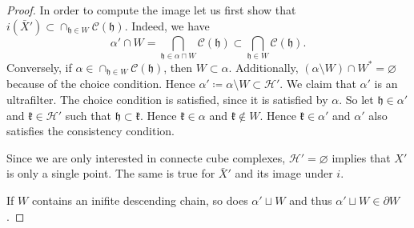 \begin{proof}
  In order to compute the image let us first show that \(i(\bar X') \subset \cap_{\mathfrak{h} \in W} \mathcal{C}(\mathfrak{h})\). Indeed, we have
  \[
    \alpha' \cap W = \bigcap_{\mathfrak{h} \in \alpha \sqcap W}\mathcal{C}(\mathfrak{h}) \subset \bigcap_{\mathfrak{h} \in W} \mathcal{C}(\mathfrak{h}).
  \]
  Conversely, if \(\alpha \in \cap_{\mathfrak{h} \in W}\mathcal{C}(\mathfrak{h})\), then \(W \subset \alpha\). Additionally, \((\alpha \setminus W) \cap W^\ast = \varnothing\) because of the choice condition. Hence \(\alpha' \coloneqq \alpha \setminus W \subset \mathcal{H}'\). We claim that \(\alpha'\) is an ultrafilter. The choice condition is satisfied, since it is satisfied by \(\alpha\). So let \(\mathfrak{h} \in \alpha'\) and \(\mathfrak{k} \in \mathcal{H}'\) such that \(\mathfrak{h} \subset \mathfrak{k}\). Hence \(\mathfrak{k} \in \alpha\) and \(\mathfrak{k} \notin W\). Hence \(\mathfrak{k} \in \alpha'\) and \(\alpha'\) also satisfies the consistency condition.

  Since we are only interested in connecte cube complexes, \(\mathcal{H}' = \varnothing\) implies that \(X'\) is only a single point. The same is true for \(\bar X'\) and its image under \(i\).

  If \(W\) contains an inifite descending chain, so does \(\alpha' \sqcup W\) and thus \(\alpha' \sqcup W \in \partial W\).
\end{proof}

